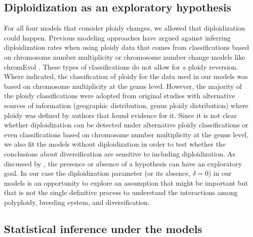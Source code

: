 \subsection{Diploidization as an exploratory hypothesis}

For all four models that consider ploidy changes, we allowed that diploidization could happen.
Previous modeling approaches \citep{mayrose_2011} have argued against inferring diploidization rates when using ploidy data that comes from classifications based on chromosome number multiplicity or chromosome number change models like chromEvol \citep{mayrose_2010}.
These types of classifications do not allow for a ploidy reversion.
Where indicated, the classification of ploidy for the data used in our models was based on chromosome multiplicity at the genus level.
However, the majority of the ploidy classifications were adopted from original studies with alternative sources of information (\eg geographic distribution, genus ploidy distribution) where ploidy was defined by authors that found evidence for it.
Since it is not clear whether diploidization can be detected under alternative ploidy classifications or even classifications based on chromosome number multiplicity at the genus level, we also fit the models without diploidization in order to test  whether the conclusions about diversification are sensitive to including diploidization.
As discussed by \citet{servedio_2014}, the presence or absence of a hypothesis can have an exploratory goal.
In our case the diploidization parameter (or its absence, $\delta=0$) in our models is an opportunity to explore an assumption that might be important but that is not the single definitive process to understand the interactions among polyploidy, breeding system, and diversification.

\subsection{Statistical inference under the models}

